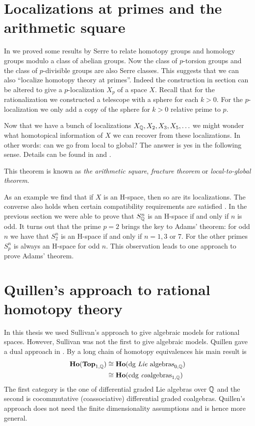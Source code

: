 

\section{Localizations at primes and the arithmetic square}
In  we proved some results by Serre to relate homotopy groups and homology groups modulo a class of abelian groups. Now the class of $p$-torsion groups and the class of $p$-divisible groups are also Serre classes. This suggests that we can also ``localize homotopy theory at primes''. Indeed the construction in section  can be altered to give a $p$-localization $X_p$ of a space $X$. Recall that for the rationalization we constructed a telescope with a sphere for each $k > 0$. For the $p$-localization we only add a copy of the sphere for $k > 0$ relative prime to $p$.

Now that we have a bunch of localizations $X_{\mathbb{Q}}, X_2, X_3, X_5, \ldots$ we might wonder what homotopical information of $X$ we can recover from these localizations. In other words: can we go from local to global? The answer is yes in the following sense. Details can be found in \cite{may2} and \cite{sullivan}.

This theorem is known as \emph{the arithmetic square}, \emph{fracture theorem} or \emph{local-to-global theorem}.

As an example we find that if $X$ is an H-space, then so are its localizations. The converse also holds when certain compatibility requirements are satisfied \cite{sullivan}. In the previous section we were able to prove that $S^n_{\mathbb{Q}}$ is an H-space if and only if $n$ is odd. It turns out that the prime $p=2$ brings the key to Adams' theorem: for odd $n$ we have that $S^n_2$ is an H-space if and only if $n=1, 3$ or $7$. For the other primes $S^n_p$ is always an H-space for odd $n$. This observation leads to one approach to prove Adams' theorem.


\section{Quillen's approach to rational homotopy theory}
In this thesis we used Sullivan's approach to give algebraic models for rational spaces. However, Sullivan was not the first to give algebraic models. Quillen gave a dual approach in \cite{quillen}. By a long chain of homotopy equivalences his main result is
\begin{align*}
	\mathbf{Ho}(\mathbf{Top}_{1, \mathbb{Q}}) &\cong \mathbf{Ho}(\text{dg \emph{Lie} algebras}_{0, \mathbb{Q}}) \\
		&\cong \mathbf{Ho}(\text{cdg \emph{co}algebras}_{1, \mathbb{Q}})
\end{align*}
The first category is the one of differential graded Lie algebras over $\mathbb{Q}$ and the second is cocommutative (coassociative) differential graded coalgebras. Quillen's approach does not need the finite dimensionality assumptions and is hence more general.

